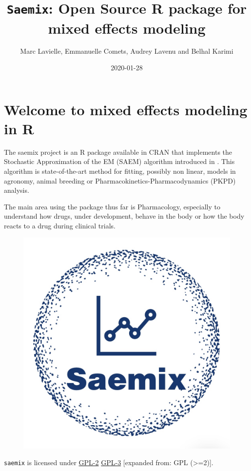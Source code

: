 \documentclass[]{book}
\title{\texttt{Saemix}: Open Source R package for mixed effects modeling}
\author{Marc Lavielle, Emmanuelle Comets, Audrey Lavenu and Belhal Karimi}
\date{2020-01-28}
\begin{document}
\maketitle

{
\hypersetup{linkcolor=black}
\setcounter{tocdepth}{1}
\tableofcontents
}
\chapter*{Welcome to mixed effects modeling in
R}\label{welcome-to-mixed-effects-modeling-in-r}

The saemix project is an R package available in CRAN that implements the
Stochastic Approximation of the EM (SAEM) algorithm introduced in
\citep{kuhn}. This algorithm is state-of-the-art method for fitting,
possibly non linear, models in agronomy, animal breeding or
Pharmacokinetics-Pharmacodynamics (PKPD) analysis.

The main area using the package thus far is Pharmacology, especially to
understand how drugs, under development, behave in the body or how the
body reacts to a drug during clinical trials.

\begin{figure}

{\centering \includegraphics[width=0.6\linewidth]{figures/logo1} 

}

\end{figure}

\texttt{saemix} is licensed under
\href{https://cran.r-project.org/web/licenses/GPL-2}{GPL-2} \textbar{}
\href{https://cran.r-project.org/web/licenses/GPL-3}{GPL-3} {[}expanded
from: GPL (\textgreater{}=2){]}.
\end{document}
